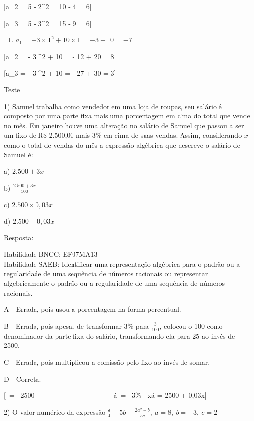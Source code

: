 [\text{\ \ \ \ \ }a_{2} = 5  - 2^2 = 10 - 4 = 6]

[{\text{\ \ \ \ \ }a}_{3} = 5  - 3^2 = 15 - 9 = 6]

\begin{enumerate}
\def\labelenumi{\alph{enumi})}
\setcounter{enumi}{3}
\tightlist
\item
  \(a_{1} = - 3 \times 1^{2} + 10 \times 1 = - 3 + 10 = - 7\)
\end{enumerate}

[\text{\ \ \ \ \ }a_{2} = - 3 ^{2} + 10  = - 12 + 20 = 8]

[{\text{\ \ \ \ \ }a}_{3} = - 3 ^{2} + 10  = - 27 + 30 = 3]

Teste

1) Samuel trabalha como vendedor em uma loja de roupas, seu salário é
composto por uma parte fixa mais uma porcentagem em cima do total que
vende no mês. Em janeiro houve uma alteração no salário de Samuel que
passou a ser um fixo de R\$ 2.500,00 mais 3\% em cima de suas vendas.
Assim, considerando \(x\) como o total de vendas do mês a expressão
algébrica que descreve o salário de Samuel é:

a) \(2.500 + 3x\)

b) \(\frac{2.500 + 3x}{100}\)

c) \(2.500 \times 0,03x\)

d) \(2.500 + 0,03x\)

Resposta:

Habilidade BNCC: EF07MA13\\
Habilidade SAEB: Identificar uma representação algébrica para o padrão
ou a regularidade de uma sequência de números racionais ou representar
algebricamente o padrão ou a regularidade de uma sequência de números
racionais.

A - Errada, pois usou a porcentagem na forma percentual.

B - Errada, pois apesar de transformar 3\% para \(\frac{3}{100}\),
colocou o 100 como denominador da parte fixa do salário, transformando
ela para 25 ao invés de 2500.

C - Errada, pois multiplicou a comissão pelo fixo ao invés de somar.

D - Correta.

[\  = \ 2500\ \ \ \ \ \ \ \ \ \ \ \ \ \ \ \ \ \ \ \ \ \ \ á\  = \ 3\%\ \ x\text{\ \ \ \ \ \ \ \ \ \ \ \ \ \ \ \ \ }á = 2500 + 0,03x]

2) O valor numérico da expressão
\(\frac{a}{4} + 5b + \frac{2a^{2} - b}{5c},\ a = 8,\ b = - 3,\ c = 2\):

